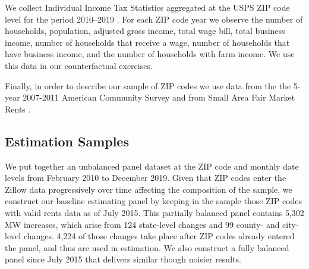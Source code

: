 We collect Individual Income Tax Statistics aggregated at the USPS ZIP code 
level for the period 2010--2019 \parencite{IRS}.
For each ZIP code year we observe the number of households, population, adjusted 
gross income, total wage bill, total business income, number of households that 
receive a wage, number of households that have business income, and the number 
of households with farm income.
We use this data in our counterfactual exercises.

Finally, in order to describe our sample of ZIP codes we use data from the 
the 5-year 2007-2011 American Community Survey \parencite[ACS;][]{CensusACS} and 
from Small Area Fair Market Rents \parencite[SAFMR;][]{hudSAFMR}.



\subsection{Estimation Samples}\label{sec:data_final_panel}

We put together an unbalanced panel dataset at the ZIP code and monthly date 
levels from February 2010 to December 2019.
Given that ZIP codes enter the Zillow data progressively over time affecting 
the composition of the sample,
we construct our baseline estimating panel by keeping in the sample those ZIP 
codes with valid rents data as of July 2015.
This partially balanced panel contains 5,302 MW increases, which arise from 
124 state-level changes and 99 county- and city-level changes.
4,224 of those changes take place after ZIP codes already entered the panel, 
and thus are used in estimation.
We also construct a fully balanced panel since July 2015 that delivers similar 
though noisier results.


